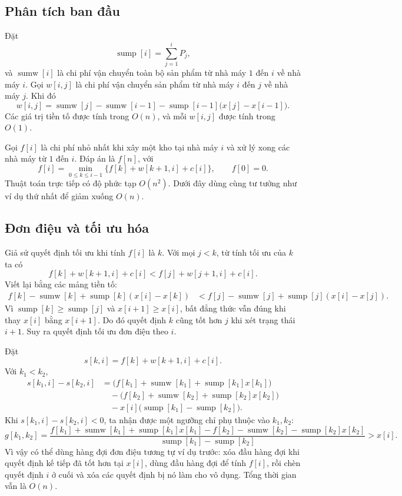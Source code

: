 \documentclass[11pt]{article}
\begin{document}
\subsection*{Phân tích ban đầu}

Đặt
\[
  \operatorname{sump}[i]=\sum_{j=1}^{i}P_j,
\]
và $\operatorname{sumw}[i]$ là chi phí vận chuyển toàn bộ sản phẩm từ nhà máy
$1$ đến $i$ về nhà máy $i$. Gọi $w[i,j]$ là chi phí vận chuyển sản phẩm từ
nhà máy $i$ đến $j$ về nhà máy $j$. Khi đó
\[
  w[i,j]=\operatorname{sumw}[j]-\operatorname{sumw}[i-1]
  -\operatorname{sump}[i-1]\bigl(x[j]-x[i-1]\bigr).
\]
Các giá trị tiền tố được tính trong $O(n)$, và mỗi $w[i,j]$ được tính trong
$O(1)$.

Gọi $f[i]$ là chi phí nhỏ nhất khi xây một kho tại nhà máy $i$ và xử lý xong
các nhà máy từ $1$ đến $i$. Đáp án là $f[n]$, với
\[
  f[i]=\min_{0\le k\le i-1}
    \{f[k]+w[k+1,i]+c[i]\},
  \qquad f[0]=0.
\]
Thuật toán trực tiếp có độ phức tạp $O(n^2)$. Dưới đây dùng cùng tư tưởng như
ví dụ thứ nhất để giảm xuống $O(n)$.

\subsection*{Đơn điệu và tối ưu hóa}

Giả sử quyết định tối ưu khi tính $f[i]$ là $k$. Với mọi $j<k$, từ tính tối
ưu của $k$ ta có
\[
  f[k]+w[k+1,i]+c[i] < f[j]+w[j+1,i]+c[i].
\]
Viết lại bằng các mảng tiền tố:
\[
\begin{aligned}
  f[k]-\operatorname{sumw}[k]
  +\operatorname{sump}[k](x[i]-x[k])
  &<
  f[j]-\operatorname{sumw}[j]
  +\operatorname{sump}[j](x[i]-x[j]).
\end{aligned}
\]
Vì $\operatorname{sump}[k]\ge\operatorname{sump}[j]$ và $x[i+1]\ge x[i]$,
bất đẳng thức vẫn đúng khi thay $x[i]$ bằng $x[i+1]$. Do đó quyết định $k$
cũng tốt hơn $j$ khi xét trạng thái $i+1$. Suy ra quyết định tối ưu đơn điệu
theo $i$.

Đặt
\[
  s[k,i]=f[k]+w[k+1,i]+c[i].
\]
Với $k_1<k_2$,
\[
\begin{aligned}
  s[k_1,i]-s[k_2,i]
  &=
  \bigl(f[k_1]+\operatorname{sumw}[k_1]
    +\operatorname{sump}[k_1]x[k_1]\bigr)\\
  &\quad-
  \bigl(f[k_2]+\operatorname{sumw}[k_2]
    +\operatorname{sump}[k_2]x[k_2]\bigr)\\
  &\quad-
  x[i]\bigl(\operatorname{sump}[k_1]-\operatorname{sump}[k_2]\bigr).
\end{aligned}
\]
Khi $s[k_1,i]-s[k_2,i]<0$, ta nhận được một ngưỡng chỉ phụ thuộc vào
$k_1,k_2$:
\[
  g[k_1,k_2]=
  \frac{
  f[k_1]+\operatorname{sumw}[k_1]+\operatorname{sump}[k_1]x[k_1]
  -
  f[k_2]-\operatorname{sumw}[k_2]-\operatorname{sump}[k_2]x[k_2]}
  {\operatorname{sump}[k_1]-\operatorname{sump}[k_2]}
  >x[i].
\]
Vì vậy có thể dùng hàng đợi đơn điệu tương tự ví dụ trước: xóa đầu hàng đợi
khi quyết định kế tiếp đã tốt hơn tại $x[i]$, dùng đầu hàng đợi để tính
$f[i]$, rồi chèn quyết định $i$ ở cuối và xóa các quyết định bị nó làm cho
vô dụng. Tổng thời gian vẫn là $O(n)$.
\end{document}

